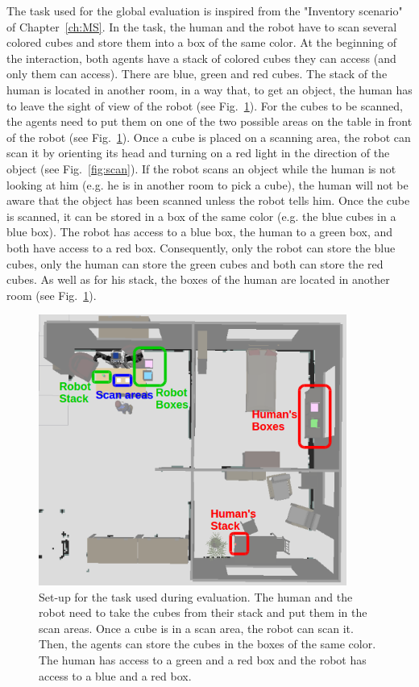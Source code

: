 \documentclass[english,a4paper,11pt,twoside]{StyleThese}
\begin{document}
The task used for the global evaluation is inspired from the "Inventory scenario" of Chapter~\ref{ch:MS}. In the task, the human and the robot have to scan several colored cubes and store them into a box of the same color. At the beginning of the interaction, both agents have a stack of colored cubes they can access (and only them can access). There are blue, green and red cubes. The stack of the human is located in another room, in a way that, to get an object, the human has to leave the sight of view of the robot (see Fig.~\ref{fig:setUpSimu}). For the cubes to be scanned, the agents need to put them on one of the two possible areas on the table in front of the robot (see Fig.~\ref{fig:setUpSimu}). Once a cube is placed on a scanning area, the robot can scan it by orienting its head and turning on a red light in the direction of the object (see Fig.~\ref{fig:scan}). If the robot scans an object while the human is not looking at him (e.g. he is in another room to pick a cube), the human will not be aware that the object has been scanned unless the robot tells him. Once the cube is scanned, it can be stored in a box of the same color (e.g. the blue cubes in a blue box). The robot has access to a blue box, the human to a green box, and both have access to a red box. Consequently, only the robot can store the blue cubes, only the human can store the green cubes and both can store the red cubes. As well as for his stack, the boxes of the human are located in another room (see Fig.~\ref{fig:setUpSimu}). 


\begin{figure}[!h]
	\centering
    \includegraphics[width=0.9\textwidth]{figs/Chapter5/SetUpSimu.png}
    \caption{Set-up for the task used during evaluation. The human and the robot need to take the cubes from their stack and put them in the scan areas. Once a cube is in a scan area, the robot can scan it. Then, the agents can store the cubes in the boxes of the same color. The human has access to a green and a red box and the robot has access to a blue and a red box.}
    \label{fig:setUpSimu}
\end{figure}
\end{document}
